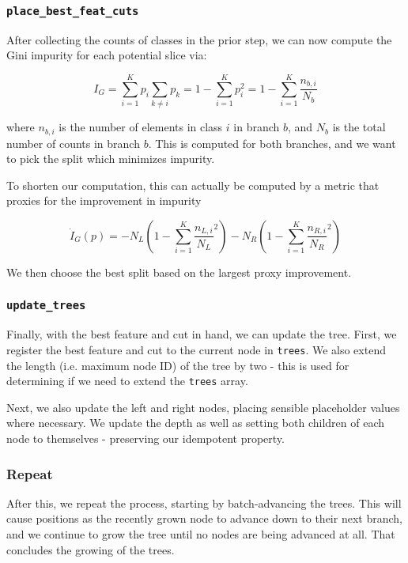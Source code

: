 \documentclass[10pt,conference]{IEEEtran}
\begin{document}
  \subsubsection{\texttt{place\_best\_feat\_cuts}}
    After collecting the counts of classes in the prior step, we can now compute the Gini impurity for each potential slice via:
    
    $$I_G = \sum_{i=1}^Kp_i \sum_{k\neq i} p_k = 1 - \sum_{i=1}^K p_i^2 
      = 1 - \sum_{i=1}^K \frac{n_{b,i}}{N_b}$$
      
    where $n_{b, i}$ is the number of elements in class $i$ in branch $b$, and $N_b$ is the total number of counts in branch $b$. This is computed for both branches, and we want to pick the split which minimizes impurity.
    
    To shorten our computation, this can actually be computed by a metric that proxies for the improvement in impurity
    
    $$ \dot{I}_G(p) = 
      -N_L \left(1 - \sum_{i=1}^K \frac{n_{L, i}}{N_L}^2 \right)
      -N_R \left(1 - \sum_{i=1}^K \frac{n_{R, i}}{N_R}^2 \right) $$
    
    We then choose the best split based on the largest proxy improvement.

  \subsubsection{\texttt{update\_trees}}
    Finally, with the best feature and cut in hand, we can update the tree. First, we register the best feature and cut to the current node in \texttt{trees}. We also extend the length (i.e. maximum node ID) of the tree by two - this is used for determining if we need to extend the \texttt{trees} array. 
    
    Next, we also update the left and right nodes, placing sensible placeholder values where necessary. We update the depth as well as setting both children of each node to themselves - preserving our idempotent property.
    
  \subsubsection{Repeat}
    After this, we repeat the process, starting by batch-advancing the trees. This will cause positions as the recently grown node to advance down to their next branch, and we continue to grow the tree until no nodes are being advanced at all.  That concludes the growing of the trees.
  
\end{document}
